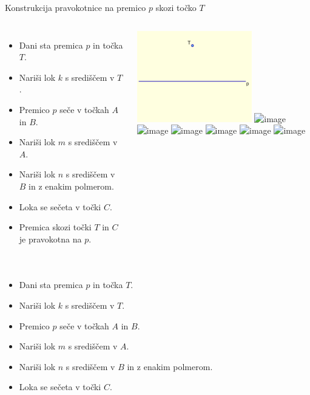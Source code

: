 \begin{frame}{Konstrukcija pravokotnice na premico $p$ skozi točko $T$}
		  \begin{columns}
			\centering
			\begin{itemize}
				 \item <1->Dani sta premica $p$ in točka $T$.
				 \item <2->Nariši lok $k$ s središčem v $T$.
				 \item <3->Premico $p$ seče v točkah $A$ in $B$.
				 \item <4->Nariši lok $m$ s središčem v $A$.
				 \item <5->Nariši lok $n$ s središčem v $B$ in z enakim polmerom.
				 \item <6->Loka se sečeta v točki $C$.
				 \item <7->Premica skozi točki $T$ in $C$ je pravokotna na $p$.
			  \end{itemize}
			  \centering
			  \includegraphics[width=50mm]{slike/fig-1.png}%
			  \includegraphics<2->[width=50mm]{slike/fig-2.png}%
			  \includegraphics<3->[width=50mm]{slike/fig-3.png}%
			  \includegraphics<4->[width=50mm]{slike/fig-4.png}%
			  \includegraphics<5->[width=50mm]{slike/fig-5.png}%
			  \includegraphics<6->[width=50mm]{slike/fig-6.png}%
			  \includegraphics<7->[width=50mm]{slike/fig-7.png}%
		  \end{columns}
		  \begin{columns}
			\column{0.55\textwidth}
			\centering
			\begin{itemize}
				 \item <1->Dani sta premica $p$ in točka $T$.
				 \item <2->Nariši lok $k$ s središčem v $T$.
				 \item <3->Premico $p$ seče v točkah $A$ in $B$.
				 \item <4->Nariši lok $m$ s središčem v $A$.
				 \item <5->Nariši lok $n$ s središčem v $B$ in z enakim polmerom.
				 \item <6->Loka se sečeta v točki $C$.

\end{itemize}
\end{columns}
\end{frame}
